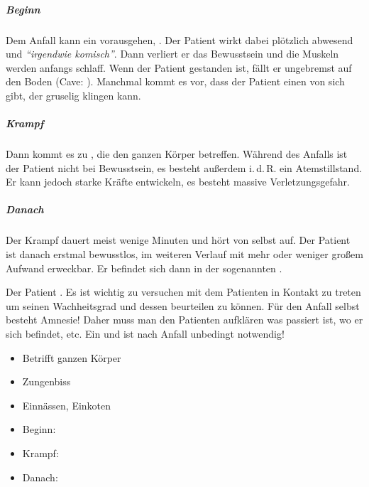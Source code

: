 \documentclass[
ngerman,
paper=a4,
asymmetric,
fontsize=10pt,
headings=small,
draft=false,
numbers=noenddot,
bibtotocnumbered,
footnotes=multiple,
]{scrreprt}
\begin{document}
\begin{enumerate}
{\subparagraph{Beginn}
Dem Anfall kann ein
 vorausgehen, . Der Patient wirkt
 dabei plötzlich abwesend und \emph{\enquote{irgendwie komisch}}.
 Dann verliert er das Bewusstsein und die Muskeln werden
 anfangs schlaff. Wenn der Patient gestanden ist, fällt er
 ungebremst auf den Boden (Cave: ).
 Manchmal kommt es vor, dass der Patient einen
  von sich gibt, der
 gruselig klingen kann. 
 
\subparagraph{Krampf}
 Dann kommt es zu
 ,
 die den ganzen Körper betreffen. Während des Anfalls ist der
 Patient nicht bei Bewusstsein, es besteht außerdem i.\,d.\,R.
 ein Atemstillstand. Er kann jedoch starke Kräfte entwickeln, es
 besteht massive
 Verletzungsgefahr.
 
\subparagraph{Danach}
 Der Krampf dauert meist wenige Minuten und hört von selbst
 auf. Der Patient ist danach erstmal bewusstlos, im weiteren
 Verlauf mit mehr oder weniger großem Aufwand erweckbar. Er
 befindet sich dann in der sogenannten
 .

Der Patient . Es ist
 wichtig zu versuchen mit dem Patienten in Kontakt zu treten
 um seinen Wachheitsgrad und dessen
  beurteilen zu können. Für den Anfall selbst besteht
 Amnesie! Daher muss man den Patienten aufklären was passiert
 ist, wo er sich befindet, etc. Ein  und
  ist nach \underline{} Anfall
 unbedingt notwendig! 
}
{
 \begin{itemize}
  \item Betrifft ganzen Körper
   \item Zungenbiss
   \item Einnässen, Einkoten
  \item Beginn:
  \item Krampf:
  \item Danach:
\end{itemize}

}
\end{enumerate}
\end{document}
